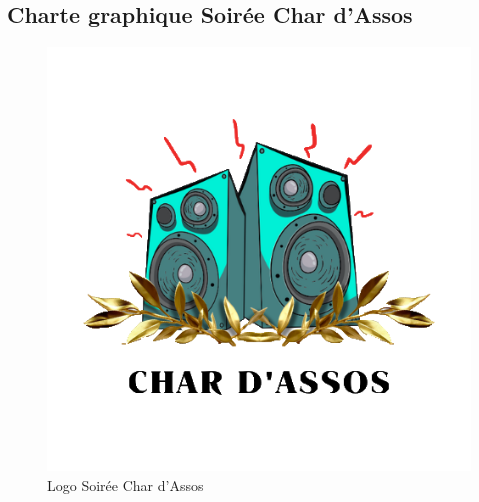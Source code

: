 \newpage


\subsection*{Charte graphique Soirée Char d'Assos}\label{subsec:charte-char-dassos}

\begin{figure}[!h]
    \begin{center}
        \includegraphics[scale=0.5]{ressources/Char_Dassos/C_2}
        \caption{Logo Soirée Char d'Assos \label{fig:logoCharDassos}}
    \end{center}
\end{figure}

\newpage

